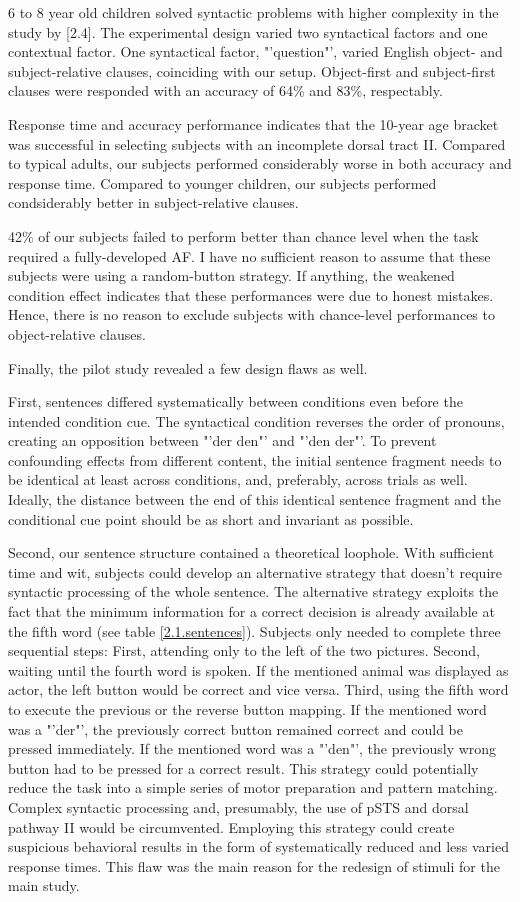 6 to 8 year old children solved syntactic problems with higher complexity in the study by [2.4].
The experimental design varied two syntactical factors and one contextual factor.
One syntactical factor, "'question"', varied English object- and subject-relative clauses, coinciding with our setup.
Object-first and subject-first clauses were responded with an accuracy of 64\% and 83\%, respectably.

Response time and accuracy performance indicates that the 10-year age bracket was successful in selecting subjects with an incomplete dorsal tract II.
Compared to typical adults, our subjects performed considerably worse in both accuracy and response time.
Compared to younger children, our subjects performed condsiderably better in subject-relative clauses.

42\% of our subjects failed to perform better than chance level when the task required a fully-developed AF.
I have no sufficient reason to assume that these subjects were using a random-button strategy.
If anything, the weakened condition effect indicates that these performances were due to honest mistakes.
Hence, there is no reason to exclude subjects with chance-level performances to object-relative clauses.


Finally, the pilot study revealed a few design flaws as well.

First, sentences differed systematically between conditions even before the intended condition cue.
The syntactical condition reverses the order of pronouns, creating an opposition between "'der den"' and "'den der"'.
To prevent confounding effects from different content, the initial sentence fragment needs to be identical at least across conditions, and, preferably, across trials as well.
Ideally, the distance between the end of this identical sentence fragment and the conditional cue point should be as short and invariant as possible.

Second, our sentence structure contained a theoretical loophole.
With sufficient time and wit, subjects could develop an alternative strategy that doesn't require syntactic processing of the whole sentence.
The alternative strategy exploits the fact that the minimum information for a correct decision is already available at the fifth word (see table \ref{2.1.sentences}).
Subjects only needed to complete three sequential steps:
First, attending only to the left of the two pictures.
Second, waiting until the fourth word is spoken.
If the mentioned animal was displayed as actor, the left button would be correct and vice versa.
Third, using the fifth word to execute the previous or the reverse button mapping.
If the mentioned word was a "'der"', the previously correct button remained correct and could be pressed immediately.
If the mentioned word was a "'den"', the previously wrong button had to be pressed for a correct result.
This strategy could potentially reduce the task into a simple series of motor preparation and pattern matching.
Complex syntactic processing and, presumably, the use of pSTS and dorsal pathway II would be circumvented.
Employing this strategy could create suspicious behavioral results in the form of systematically reduced and less varied response times.
This flaw was the main reason for the redesign of stimuli for the main study.